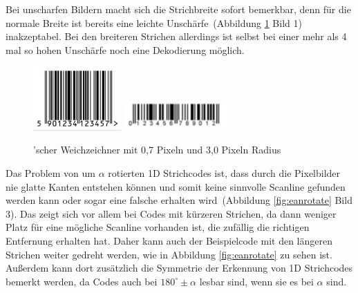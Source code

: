 Bei unscharfen Bildern macht sich die Strichbreite sofort bemerkbar, denn für die normale Breite ist bereits eine leichte Unschärfe~(Abbildung \ref{fig:eanblurry} Bild 1) inakzeptabel. Bei den breiteren Strichen allerdings ist selbst bei einer mehr als 4 mal so hohen Unschärfe noch eine Dekodierung möglich.
\begin{figure}[H]
  \centering
  \includegraphics[width=0.30\textwidth]{img/EAN13/blurry_01_07.jpg}
  \includegraphics[width=0.35\textwidth]{img/EAN13/blurry_02_3.jpg}
  \caption{'scher Weichzeichner mit 0,7 Pixeln und 3,0 Pixeln Radius}
  \label{fig:eanblurry}
\end{figure}

Das Problem von um $\alpha$ rotierten 1D Strichcodes ist, dass durch die Pixelbilder nie glatte Kanten entstehen können und somit keine sinnvolle Scanline gefunden werden kann oder sogar eine falsche erhalten wird~(Abbildung \ref{fig:eanrotate} Bild 3). Das zeigt sich vor allem bei Codes mit kürzeren Strichen, da dann weniger Platz für eine mögliche Scanline vorhanden ist, die zufällig die richtigen Entfernung erhalten hat. Daher kann auch der Beispielcode mit den längeren Strichen weiter gedreht werden, wie in Abbildung \ref{fig:eanrotate} zu sehen ist. Außerdem kann dort zusätzlich die Symmetrie der Erkennung von 1D Strichcodes bemerkt werden, da Codes auch bei $180^\circ \pm \alpha$ lesbar sind, wenn sie es bei $\alpha$ sind.

